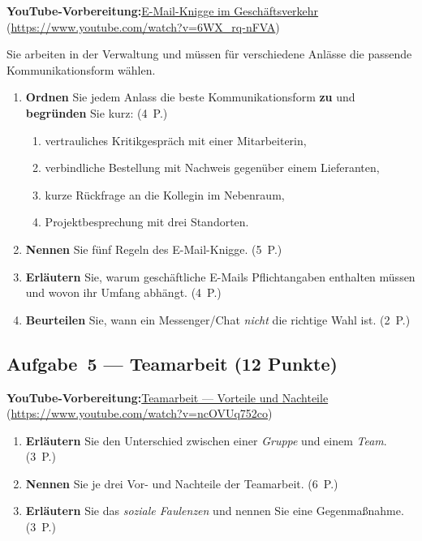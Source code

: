 \documentclass[11pt, a4paper]{article}
\begin{document}
\noindent\textbf{\color{bfwAccent}YouTube-Vorbereitung:}\enspace \href{https://www.youtube.com/watch?v=6WX_rq-nFVA}{E-Mail-Knigge im Geschäftsverkehr} (\url{https://www.youtube.com/watch?v=6WX_rq-nFVA})

\medskip
Sie arbeiten in der Verwaltung und müssen für verschiedene Anlässe die passende
Kommunikationsform wählen.

\begin{enumerate}[label=(\alph*)]
  \item \textbf{Ordnen} Sie jedem Anlass die beste Kommunikationsform \textbf{zu} und \textbf{begründen} Sie kurz: \hfill (4~P.)
    \begin{enumerate}[label=\arabic*., leftmargin=*]
      \item vertrauliches Kritikgespräch mit einer Mitarbeiterin,
      \item verbindliche Bestellung mit Nachweis gegenüber einem Lieferanten,
      \item kurze Rückfrage an die Kollegin im Nebenraum,
      \item Projektbesprechung mit drei Standorten.
    \end{enumerate}
  \item \textbf{Nennen} Sie fünf Regeln des E-Mail-Knigge. \hfill (5~P.)
  \item \textbf{Erläutern} Sie, warum geschäftliche E-Mails Pflichtangaben enthalten müssen und wovon ihr Umfang abhängt. \hfill (4~P.)
  \item \textbf{Beurteilen} Sie, wann ein Messenger/Chat \emph{nicht} die richtige Wahl ist. \hfill (2~P.)
\end{enumerate}

\subsection*{Aufgabe~5 --- Teamarbeit (12 Punkte)}

\noindent\textbf{\color{bfwAccent}YouTube-Vorbereitung:}\enspace \href{https://www.youtube.com/watch?v=ncOVUq752co}{Teamarbeit --- Vorteile und Nachteile} (\url{https://www.youtube.com/watch?v=ncOVUq752co})

\medskip
\begin{enumerate}[label=(\alph*)]
  \item \textbf{Erläutern} Sie den Unterschied zwischen einer \emph{Gruppe} und einem \emph{Team}. \hfill (3~P.)
  \item \textbf{Nennen} Sie je drei Vor- und Nachteile der Teamarbeit. \hfill (6~P.)
  \item \textbf{Erläutern} Sie das \emph{soziale Faulenzen} und nennen Sie eine Gegenmaßnahme. \hfill (3~P.)
\end{enumerate}
\end{document}
